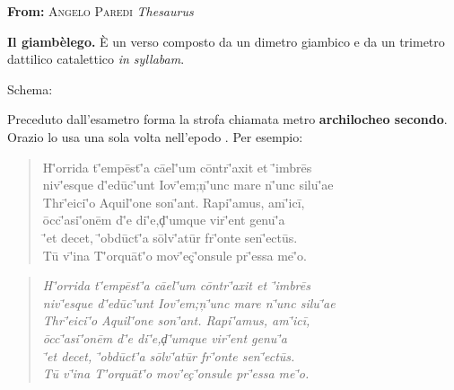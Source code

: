 \documentclass[12pt]{report}
\begin{document}
{\large\textbf{From:} \textsc{Angelo Paredi} \textit{Thesaurus}}\par 
\vspace{5ex}
\textbf{Il giamb\`elego.} \`E un verso composto da un dimetro giambico
e da un trimetro dattilico catalettico \textit{in syllabam}.\par
\vspace{2ex}
Schema:\ \ \metra{\mb\M\s\b\M\s\bm\M\s\b\Bm\c\M\b\b\s\M\b\b\s\Bm}\par
\vspace{2ex}
Preceduto dall'esametro forma la strofa chiamata metro 
\textbf{archilocheo secondo}.  Orazio lo usa una sola volta
nell'epodo . Per esempio:
\begin{verse}
\begin{metrica}    
H\='orr\-id\-a t\='emp\=est\='a c\={ae}l\='um c\=ontr\='ax\-it \-et \='imbr\=es\\ 
\quad n\-iv\='esqu\-e d\='ed\=uc\='unt I\-ov\='em;\c n\='unc m\-ar\-e n\='unc s\-il\-u\='{ae}\\
Thr\='e\-ic\-i\='o \-Aqu\-il\='on\-e s\-on\='ant. R\-ap\-i\='am\-us, \-am\='ic\=i,\\
\quad \=occ\='as\-i\='on\=em d\='e d\-i\='e,\c d\='umqu\-e v\-ir\='ent g\-en\-u\='a\\
\='et d\-ec\-et, \='obd\=uct\='a s\=olv\='at\=ur fr\='ont\-e s\-en\='ect\=us.\\
\quad T\=u v\='in\-a T\='orqu\=at\='o m\-ov\='e\c  c\='ons\-ul\-e pr\='ess\-a m\-e\='o.\\
\end{metrica}
\end{verse}
%
\vspace{3ex}
%
\begin{verse}
\begin{metrica}  \it   
H\='orr\-id\-a t\='emp\=est\='a c\={ae}l\='um c\=ontr\='ax\-it \-et \='imbr\=es\\ 
\quad n\-iv\='esqu\-e d\='ed\=uc\='unt I\-ov\='em;\c n\='unc m\-ar\-e n\='unc s\-il\-u\='{ae}\\
Thr\='e\-ic\-i\='o \-Aqu\-il\='on\-e s\-on\='ant. R\-ap\-i\='am\-us, \-am\='ic\=i,\\
\quad \=occ\='as\-i\='on\=em d\='e d\-i\='e,\c d\='umqu\-e v\-ir\='ent g\-en\-u\='a\\
\='et d\-ec\-et, \='obd\=uct\='a s\=olv\='at\=ur fr\='ont\-e s\-en\='ect\=us.\\
\quad T\=u v\='in\-a T\='orqu\=at\='o m\-ov\='e\c  c\='ons\-ul\-e pr\='ess\-a m\-e\='o.\\
\end{metrica}
\end{verse}
\end{document}
